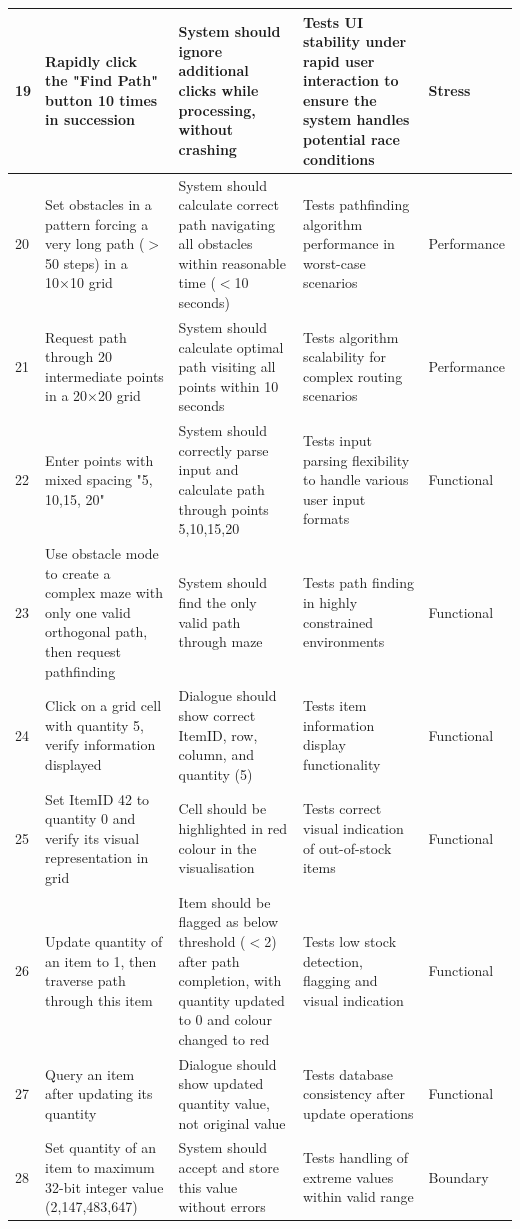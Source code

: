 \begin{longtable}{|p{}|p{}|p{}|p{}|p{}|}
	\hline
	19 & Rapidly click the "Find Path" button 10 times in succession & System should ignore additional clicks while processing, without crashing & Tests UI stability under rapid user interaction to ensure the system handles potential race conditions & Stress \\
	\hline
	20 & Set obstacles in a pattern forcing a very long path ($>$50 steps) in a 10×10 grid & System should calculate correct path navigating all obstacles within reasonable time ($<$10 seconds) & Tests pathfinding algorithm performance in worst-case scenarios & Performance \\
	\hline
	21 & Request path through 20 intermediate points in a 20×20 grid & System should calculate optimal path visiting all points within 10 seconds & Tests algorithm scalability for complex routing scenarios & Performance \\
	\hline
	22 & Enter points with mixed spacing "5, 10,15, 20" & System should correctly parse input and calculate path through points 5,10,15,20 & Tests input parsing flexibility to handle various user input formats & Functional \\
	\hline
	23 & Use obstacle mode to create a complex maze with only one valid orthogonal path, then request pathfinding & System should find the only valid path through maze & Tests path finding in highly constrained environments & Functional \\
	\hline
	24 & Click on a grid cell with quantity 5, verify information displayed & Dialogue should show correct ItemID, row, column, and quantity (5) & Tests item information display functionality & Functional \\
	\hline
	25 & Set ItemID 42 to quantity 0 and verify its visual representation in grid & Cell should be highlighted in red colour in the visualisation & Tests correct visual indication of out-of-stock items & Functional \\
	\hline
	26 & Update quantity of an item to 1, then traverse path through this item & Item should be flagged as below threshold ($<$2) after path completion, with quantity updated to 0 and colour changed to red & Tests low stock detection, flagging and visual indication & Functional \\
	\hline
	27 & Query an item after updating its quantity & Dialogue should show updated quantity value, not original value & Tests database consistency after update operations & Functional \\
	\hline
	28 & Set quantity of an item to maximum 32-bit integer value (2,147,483,647) & System should accept and store this value without errors & Tests handling of extreme values within valid range & Boundary \\

\end{longtable}

